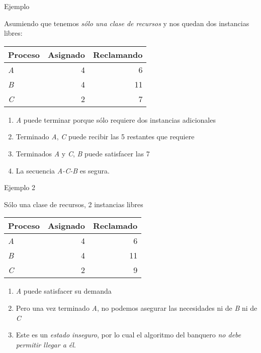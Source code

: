 \documentclass[presentation]{beamer}
\begin{document}
\begin{frame}[label={sec:org11d12c3}]{Ejemplo}
\begin{center}
Asumiendo que tenemos \emph{sólo una clase de recursos} y nos quedan dos
instancias libres:
\end{center}
\begin{center}
\begin{tabular}{lrr}
Proceso & Asignado & Reclamando\\
\hline
\emph{A} & 4 & 6\\
\emph{B} & 4 & 11\\
\emph{C} & 2 & 7\\
\end{tabular}
\end{center}

\begin{enumerate}
\item \emph{A} puede terminar porque sólo requiere dos instancias adicionales
\item Terminado \emph{A}, \emph{C} puede recibir las 5 restantes que requiere
\item Terminados \emph{A} y \emph{C}, \emph{B} puede satisfacer las 7
\item La secuencia \emph{A-C-B} es segura.
\end{enumerate}
\end{frame}

\begin{frame}[label={sec:org89cd926}]{Ejemplo 2}
\begin{center}
Sólo una clase de recursos, 2 instancias libres
\end{center}
\begin{center}
\begin{tabular}{lrr}
Proceso & Asignado & Reclamado\\
\hline
\emph{A} & 4 & 6\\
\emph{B} & 4 & 11\\
\emph{C} & 2 & 9\\
\end{tabular}
\end{center}
\begin{enumerate}
\item \emph{A} puede satisfacer su demanda
\item Pero una vez terminado \emph{A}, no podemos asegurar las necesidades ni
de \emph{B} ni de \emph{C}
\item Este es un \emph{estado inseguro}, por lo cual el algoritmo del
banquero \emph{no debe permitir llegar a él}.
\end{enumerate}
\end{frame}
\end{document}
